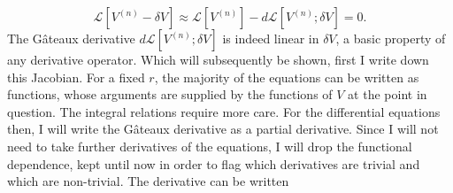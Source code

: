 \begin{equation}
\mathcal{L}[V^{(n)}-\delta V] \approx \mathcal{L}[V^{(n)}] - d\mathcal{L}[V^{(n)};\delta V] = 0. 
\end{equation}
The G\^ateaux derivative $d\mathcal{L}[V^{(n)};\delta V]$ is indeed
linear in $\delta V$, a basic property of any derivative operator. Which will subsequently be shown, first I write down this Jacobian. For a fixed $r$, the majority of the equations can be written as functions, whose arguments are supplied by the functions of $V$ at the point in question. The integral relations require more care. For the differential equations then, I will write the G\^ateaux derivative as a partial derivative. Since I will not need to take further derivatives of the equations, I will drop the functional dependence, kept until now in order to flag which derivatives are trivial and which are non-trivial. The derivative can be written
